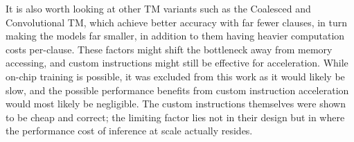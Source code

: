 It is also worth looking at other TM variants such as the Coalesced and Convolutional TM, which achieve better accuracy with far fewer clauses, in turn making the models far smaller, in addition to them having heavier computation costs per-clause. These factors might shift the bottleneck away from memory accessing, and custom instructions might still be effective for acceleration. While on-chip training is possible, it was excluded from this work as it would likely be slow, and the possible performance benefits from custom instruction acceleration would most likely be negligible. The custom instructions themselves were shown to be cheap and correct; the limiting factor lies not in their design but in where the performance cost of inference at scale actually resides.